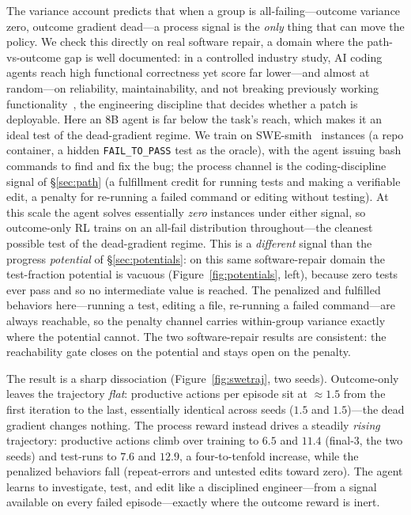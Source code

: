 The variance account predicts that when a group is all-failing---outcome variance zero, outcome gradient dead---a process signal is the \emph{only} thing that can move the policy. We check this directly on real software repair, a domain where the path-vs-outcome gap is well documented: in a controlled industry study, AI coding agents reach high functional correctness yet score far lower---and almost at random---on reliability, maintainability, and not breaking previously working functionality~\citep{hong2025aicoding}, the engineering discipline that decides whether a patch is deployable. Here an 8B agent is far below the task's reach, which makes it an ideal test of the dead-gradient regime. We train on SWE-smith~\citep{swesmith} instances (a repo container, a hidden \texttt{FAIL\_TO\_PASS} test as the oracle), with the agent issuing bash commands to find and fix the bug; the process channel is the coding-discipline signal of \S\ref{sec:path} (a fulfillment credit for running tests and making a verifiable edit, a penalty for re-running a failed command or editing without testing). At this scale the agent solves essentially \emph{zero} instances under either signal, so outcome-only RL trains on an all-fail distribution throughout---the cleanest possible test of the dead-gradient regime. This is a \emph{different} signal than the progress \emph{potential} of \S\ref{sec:potentials}: on this same software-repair domain the test-fraction potential is vacuous (Figure~\ref{fig:potentials}, left), because zero tests ever pass and so no intermediate value is reached. The penalized and fulfilled behaviors here---running a test, editing a file, re-running a failed command---are always reachable, so the penalty channel carries within-group variance exactly where the potential cannot. The two software-repair results are consistent: the reachability gate closes on the potential and stays open on the penalty.

The result is a sharp dissociation (Figure~\ref{fig:swetraj}, two seeds). Outcome-only leaves the trajectory \emph{flat}: productive actions per episode sit at $\approx\!1.5$ from the first iteration to the last, essentially identical across seeds ($1.5$ and $1.5$)---the dead gradient changes nothing. The process reward instead drives a steadily \emph{rising} trajectory: productive actions climb over training to $6.5$ and $11.4$ (final-3, the two seeds) and test-runs to $7.6$ and $12.9$, a four-to-tenfold increase, while the penalized behaviors fall (repeat-errors and untested edits toward zero). The agent learns to investigate, test, and edit like a disciplined engineer---from a signal available on every failed episode---exactly where the outcome reward is inert.

